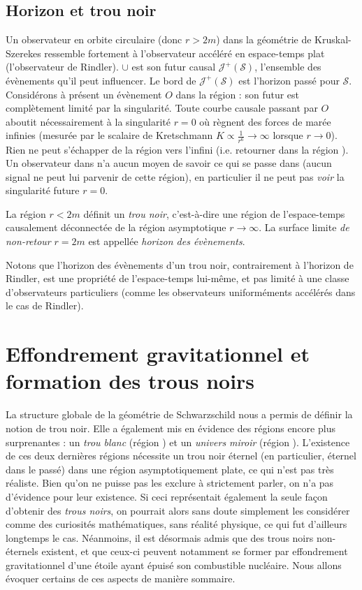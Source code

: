 \subsection{Horizon et trou noir}
Un observateur en orbite circulaire (donc $r>2m$) dans la géométrie de Kruskal-Szerekes ressemble fortement à l'observateur accéléré en espace-temps plat (l'observateur de Rindler).  $\cup$  est son futur causal $\mathcal{J}^+(\mathcal{S})$, l'ensemble des évènements qu'il peut influencer. Le bord de $\mathcal{J}^+(\mathcal{S})$ est l'horizon passé pour $\mathcal{S}$. \\
Considérons à présent un évènement $O$ dans la région  : son futur est complètement limité par la singularité. Toute courbe causale passant par $O$ aboutit nécessairement à la singularité $r=0$ où règnent des forces de marée infinies (mesurée par le scalaire de Kretschmann $K \propto \frac{1}{r^6} \to \infty$ lorsque $r\to 0$). Rien ne peut s'échapper de la région  vers l'infini (i.e. retourner dans la région ). Un observateur dans  n'a aucun moyen de savoir ce qui se passe dans  (aucun signal ne peut lui parvenir de cette région), en particulier il ne peut pas \emph{voir} la singularité future $r=0$. 
\begin{theoremframe}
    \begin{defi}
        La région $r<2m$ définit un \emph{trou noir}, c'est-à-dire une région de l'espace-temps causalement déconnectée de la région asymptotique $r \to \infty$. La surface limite \emph{de non-retour} $r=2m$ est appellée \emph{horizon des évènements}.
    \end{defi}
\end{theoremframe}
Notons que l'horizon des évènements d'un trou noir, contrairement à l'horizon de Rindler, est une propriété de l'espace-temps lui-même, et pas limité à une classe d'observateurs particuliers (comme les observateurs uniforméments accélérés dans le cas de Rindler).
\section{Effondrement gravitationnel et formation des trous noirs}
La structure globale de la géométrie de Schwarzschild nous a permis de définir la notion de trou noir. Elle a également mis en évidence des régions encore plus surprenantes : un \emph{trou blanc} (région ) et un \emph{univers miroir} (région ). L'existence de ces deux dernières régions nécessite un trou noir éternel (en particulier, éternel dans le passé) dans une région asymptotiquement plate, ce qui n'est pas très réaliste. Bien qu'on ne puisse pas les exclure à strictement parler, on n'a pas d'évidence pour leur existence. Si ceci représentait également la seule façon d'obtenir des \emph{trous noirs}, on pourrait alors sans doute simplement les considérer comme des curiosités mathématiques, sans réalité physique, ce qui fut d'ailleurs longtemps le cas. Néanmoins, il est désormais admis que des trous noirs non-éternels existent, et que ceux-ci peuvent notamment se former par effondrement gravitationnel d'une étoile ayant épuisé son combustible nucléaire. Nous allons évoquer certains de ces aspects de manière sommaire.
